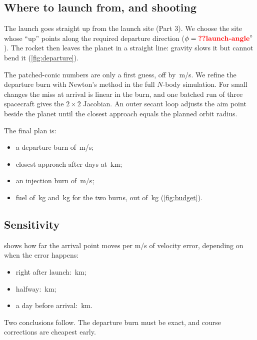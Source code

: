 \documentclass[aps,prd,twocolumn,nofootinbib,floatfix,superscriptaddress]{revtex4-2}
\begin{document}
\subsection{Where to launch from, and shooting}
The launch goes straight up from the launch site (Part 3).
We choose the site whose ``up'' points along the required departure direction ($\phi=\val{launch-angle}^\circ$).
The rocket then leaves the planet in a straight line: gravity slows it but cannot bend it (\cref{fig:departure}).

The patched-conic numbers are only a first guess, off by \,m/s.
We refine the departure burn with Newton's method in the full $N$-body simulation.
For small changes the miss at arrival is linear in the burn, and one batched run of three spacecraft gives the $2\times2$ Jacobian.
An outer secant loop adjusts the aim point beside the planet until the closest approach equals the planned orbit radius.

The final plan is:
\begin{itemize}
\item a departure burn of \,m/s;
\item closest approach after  days at \,km;
\item an injection burn of \,m/s;
\item fuel of \,kg and \,kg for the two burns, out of \,kg (\cref{fig:budget}).
\end{itemize}

\subsection{Sensitivity}
 shows how far the arrival point moves per m/s of velocity error, depending on when the error happens:
\begin{itemize}
\item right after launch: \,km;
\item halfway: \,km;
\item a day before arrival: \,km.
\end{itemize}
Two conclusions follow.
The departure burn must be exact, and course corrections are cheapest early.
\end{document}
